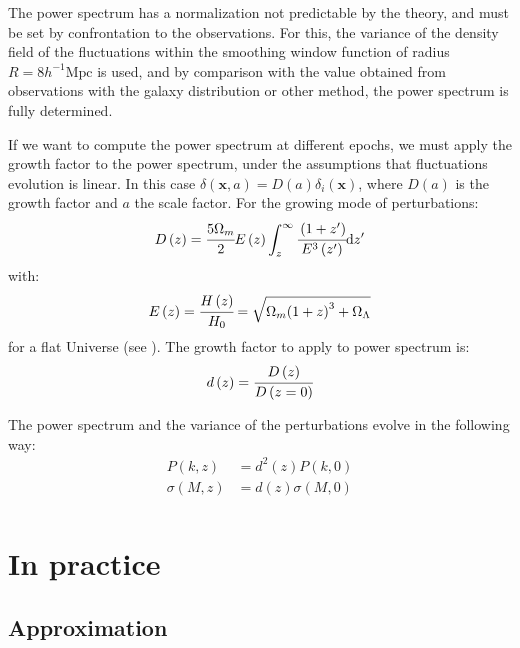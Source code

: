 The power spectrum has a normalization not predictable by the theory, and must
be set by confrontation to the observations. For this, the variance of the
density field of the fluctuations within the smoothing window function of
radius $R=8 h^{-1}\mathrm{Mpc}$ is used, and by comparison with the value
obtained from observations with the galaxy distribution or other method, the
power spectrum is fully determined.

If we want to compute the power spectrum at different epochs, we must apply
the growth factor to the power spectrum, under the assumptions that
fluctuations evolution is linear. In this case $\delta \left(\textbf{x},
a\right) = D \left(a\right) \delta_i \left(\textbf{x}\right)$, where
$D\left(a\right)$ is the growth factor and $a$ the scale factor. For the
growing mode of perturbations:
%
\begin{equation}
    D \left(z\right) = \cfrac{5\Omega_m}{2}E \left(z\right)
    \int_z^\infty \cfrac{\left(1+z'\right)}{E^3\left(z'\right)} {\rm{d}} z'
\end{equation}
%
with:
%
\begin{equation}
    E \left(z\right) = \cfrac{H \left(z\right)}{H_0} =
    \sqrt{\Omega_m {\left(1+z\right)}^3 + \Omega_\Lambda}
\end{equation}
%
for a flat Universe (see \citet{Hogg+99, Carroll+92}). The growth factor to
apply to power spectrum is:
%
\begin{equation}
    d \left(z\right) = \cfrac{D \left(z\right)}{D \left(z=0\right)}
\end{equation}

The power spectrum and the variance of the perturbations evolve in the
following way:
%
\begin{align}
    P \left(k, z\right) &= d^2 \left(z\right) P \left(k, 0\right)
    \nonumber\\
    \sigma \left(M, z\right) &= d \left(z\right) \sigma \left(M,0\right)
    \nonumber\\
\end{align}

\section{In practice}
\label{sec:in_practice}

\subsection{Approximation}
\label{sub:approximation}

